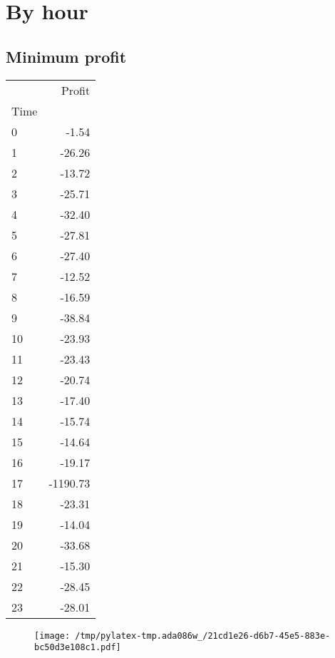 \documentclass{article}%
\begin{document}
%
\newpage %
\section{By hour}%
\label{sec:Byhour}%
\subsection{Minimum profit }%
\label{subsec:Minimumprofit}%
\begin{tabular}{lr}
\toprule
{} &   Profit \\
Time &          \\
\midrule
0    &    -1.54 \\
1    &   -26.26 \\
2    &   -13.72 \\
3    &   -25.71 \\
4    &   -32.40 \\
5    &   -27.81 \\
6    &   -27.40 \\
7    &   -12.52 \\
8    &   -16.59 \\
9    &   -38.84 \\
10   &   -23.93 \\
11   &   -23.43 \\
12   &   -20.74 \\
13   &   -17.40 \\
14   &   -15.74 \\
15   &   -14.64 \\
16   &   -19.17 \\
17   & -1190.73 \\
18   &   -23.31 \\
19   &   -14.04 \\
20   &   -33.68 \\
21   &   -15.30 \\
22   &   -28.45 \\
23   &   -28.01 \\
\bottomrule
\end{tabular}
%


\begin{figure}[htbp]%
\centering%
\texttt{[image: /tmp/pylatex-tmp.ada086w\_/21cd1e26-d6b7-45e5-883e-bc50d3e108c1.pdf]}%
\end{figure}

%
\newpage %
\end{document}
